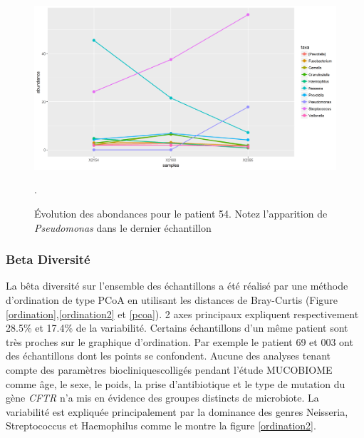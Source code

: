 \documentclass[12pt,a4paper]{article}
\begin{document}
\begin{figure}
\begin{center}
\includegraphics[scale=0.60]{img/curve_054.png}\hfill
\end{center}
\caption{Évolution des abondances pour le patient 54. Notez l'apparition de \textit{Pseudomonas} dans le dernier échantillon}.
\label{evolution54}
\end{figure}

\subsubsection{Beta Diversité}
La bêta diversité sur l’ensemble des échantillons a été réalisé par une méthode d’ordination de type PCoA en utilisant les distances de Bray-Curtis (Figure \ref{ordination},\ref{ordination2} et \ref{pcoa}).
2 axes principaux expliquent respectivement 28.5\% et 17.4\% de la variabilité.
Certains échantillons d’un même patient sont très proches sur le graphique d’ordination. Par exemple le patient 69 et 003 ont des échantillons dont les points se confondent.
Aucune des analyses tenant compte des paramètres biocliniquescolligés pendant l'étude MUCOBIOME comme âge, le sexe, le poids, la prise d'antibiotique et le type de mutation du gène \textit{CFTR} n’a mis en évidence des groupes distincts de microbiote. La variabilité est expliquée principalement par la dominance des genres Neisseria, Streptococcus et Haemophilus comme le montre la figure \ref{ordination2}.
\end{document}
